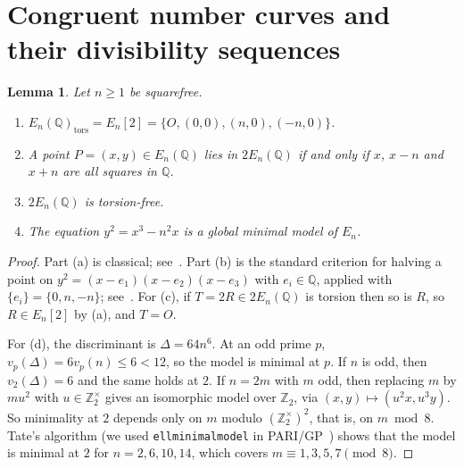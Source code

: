 \documentclass[11pt]{amsart}
\newtheorem{lemma}[theorem]{Lemma}
\theoremstyle{definition}
\theoremstyle{remark}
\newcommand{\Q}{\mathbb{Q}}
\newcommand{\Z}{\mathbb{Z}}
\begin{document}
\section{Congruent number curves and their divisibility sequences}

\begin{lemma}\label{lem:facts}
Let $n\ge1$ be squarefree.
\begin{enumerate}
\item[(a)] $E_n(\Q)_{\mathrm{tors}}=E_n[2]=\{O,(0,0),(n,0),(-n,0)\}$.
\item[(b)] A point $P=(x,y)\in E_n(\Q)$ lies in $2E_n(\Q)$ if and only if $x$, $x-n$ and $x+n$ are all
squares in $\Q$.
\item[(c)] $2E_n(\Q)$ is torsion-free.
\item[(d)] The equation $y^2=x^3-n^2x$ is a global minimal model of $E_n$.
\end{enumerate}
\end{lemma}

\begin{proof}
Part (a) is classical; see~\cite[Ch.~I, \S9]{Ko}. Part (b) is the standard criterion for halving a point
on $y^2=(x-e_1)(x-e_2)(x-e_3)$ with $e_i\in\Q$, applied with $\{e_i\}=\{0,n,-n\}$; see~\cite[Ch.~IV]{Kn}.
For (c), if $T=2R\in2E_n(\Q)$ is torsion then so is $R$, so $R\in E_n[2]$ by (a), and $T=O$.

For (d), the discriminant is $\Delta=64n^6$. At an odd prime $p$, $v_p(\Delta)=6v_p(n)\le6<12$, so the
model is minimal at $p$. If $n$ is odd, then $v_2(\Delta)=6$ and the same holds at $2$. If $n=2m$ with
$m$ odd, then replacing $m$ by $mu^2$ with $u\in\Z_2^\times$ gives an isomorphic model over $\Z_2$, via
$(x,y)\mapsto(u^2x,u^3y)$. So minimality at $2$ depends only on $m$ modulo $(\Z_2^\times)^2$, that is, on
$m\bmod8$. Tate's algorithm (we used \texttt{ellminimalmodel} in PARI/GP~\cite{PARI}) shows that the model
is minimal at $2$ for $n=2,6,10,14$, which covers $m\equiv1,3,5,7\pmod8$.
\end{proof}
\end{document}
